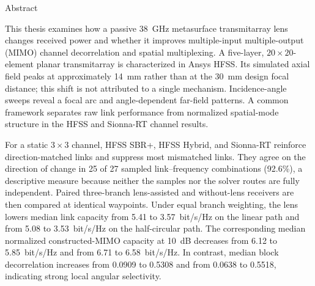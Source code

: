 \documentclass[12pt, twoside, openright]{book}
\begin{document}


\noindent{}
\endgroup
\newpage
\mbox{}
\newpage





{}
\begin{center}
	{\chinnesesize Abstract}
\end{center}

\begingroup
{}
\setlength{\parskip}{0.3em}
This thesis examines how a passive 38~GHz metasurface transmitarray lens changes received power and whether it improves multiple-input multiple-output (MIMO) channel decorrelation and spatial multiplexing. A five-layer, $20\times20$-element planar transmitarray is characterized in Ansys HFSS. Its simulated axial field peaks at approximately 14~mm rather than at the 30~mm design focal distance; this shift is not attributed to a single mechanism. Incidence-angle sweeps reveal a focal arc and angle-dependent far-field patterns. A common framework separates raw link performance from normalized spatial-mode structure in the HFSS and Sionna-RT channel results.

For a static $3\times3$ channel, HFSS SBR+, HFSS Hybrid, and Sionna-RT reinforce direction-matched links and suppress most mismatched links. They agree on the direction of change in 25 of 27 sampled link--frequency combinations (92.6\%), a descriptive measure because neither the samples nor the solver routes are fully independent. Paired three-branch lens-assisted and without-lens receivers are then compared at identical waypoints. Under equal branch weighting, the lens lowers median link capacity from 5.41 to 3.57~bit/s/Hz on the linear path and from 5.08 to 3.53~bit/s/Hz on the half-circular path. The corresponding median normalized constructed-MIMO capacity at 10~dB decreases from 6.12 to 5.85~bit/s/Hz and from 6.71 to 6.58~bit/s/Hz. In contrast, median block decorrelation increases from 0.0909 to 0.5308 and from 0.0638 to 0.5518, indicating strong local angular selectivity.
\end{document}
